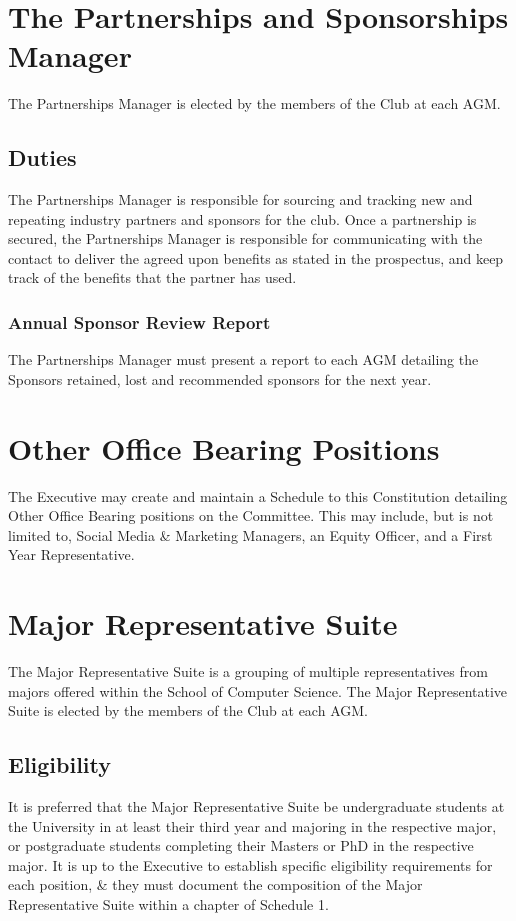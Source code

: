 \documentclass[11pt]{article}
\begin{document}
\section{The Partnerships and Sponsorships Manager}
The Partnerships Manager is elected by the members of the Club at each AGM.
\subsection{Duties}
The Partnerships Manager is responsible for sourcing and tracking new and repeating industry partners and sponsors for the club.
Once a partnership is secured, the Partnerships Manager is responsible for communicating with the contact to deliver the agreed upon benefits as stated in the prospectus, and keep track of the benefits that the partner has used.
\subsubsection{Annual Sponsor Review Report}
The Partnerships Manager must present a report to each AGM detailing the Sponsors retained, lost and recommended sponsors for the next year.

\section{Other Office Bearing Positions}
The Executive may create and maintain a Schedule to this Constitution detailing Other Office Bearing positions on the Committee. This may include, but is not limited to, Social Media \& Marketing Managers, an Equity Officer, and a First Year Representative. 

\section{Major Representative Suite}
The Major Representative Suite is a grouping of multiple representatives from majors offered within the School of Computer Science. The Major Representative Suite is elected by the members of the Club at each AGM.
\subsection{Eligibility}
It is preferred that the Major Representative Suite be undergraduate students at the University in at least their third year and majoring in the respective major, or postgraduate students completing their Masters or PhD in the respective major. It is up to the Executive to establish specific eligibility requirements for each position, \& they must document the composition of the Major Representative Suite within a chapter of Schedule 1.
\end{document}
